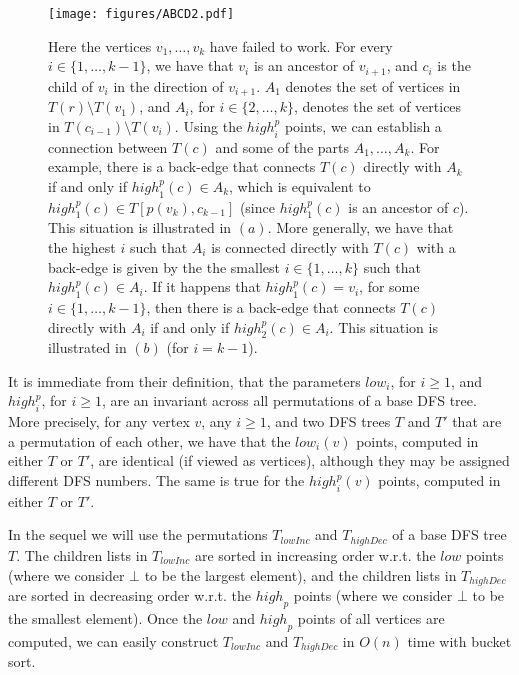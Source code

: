 \documentclass[11pt,a4paper]{article}
\begin{document}
\begin{figure}[h!]\centering
\texttt{[image: figures/ABCD2.pdf]}
\caption{\small{Here the vertices $v_1,\dots,v_k$ have failed to work. For every $i\in\{1,\dots,k-1\}$, we have that $v_i$ is an ancestor of $v_{i+1}$, and $c_i$ is the child of $v_i$ in the direction of $v_{i+1}$. $A_1$ denotes the set of vertices in $T(r)\setminus T(v_1)$, and $A_i$, for $i\in\{2,\dots,k\}$, denotes the set of vertices in $T(c_{i-1})\setminus T(v_i)$. Using the $\mathit{high}^p_i$ points, we can establish a connection between $T(c)$ and some of the parts $A_1,\dots,A_k$. For example, there is a back-edge that connects $T(c)$ directly with $A_k$ if and only if $\mathit{high}^p_1(c)\in A_k$, which is equivalent to $\mathit{high}^p_1(c)\in T[p(v_k),c_{k-1}]$ (since $\mathit{high}^p_1(c)$ is an ancestor of $c$). This situation is illustrated in $(a)$. More generally, we have that the highest $i$ such that $A_i$ is connected directly with $T(c)$ with a back-edge is given by the the smallest $i\in\{1,\dots,k\}$ such that $\mathit{high}^p_1(c)\in A_i$. If it happens that $\mathit{high}^p_1(c)=v_i$, for some $i\in\{1,\dots,k-1\}$, then there is a back-edge that connects $T(c)$ directly with $A_i$ if and only if $\mathit{high}^p_2(c)\in A_i$. This situation is illustrated in $(b)$ (for $i=k-1$).}}\label{figure:ABCD2}
\end{figure}

It is immediate from their definition, that the parameters $\mathit{low}_i$, for $i\geq 1$, and $\mathit{high}^p_i$, for $i\geq 1$, are an invariant across all permutations of a base DFS tree. More precisely, for any vertex $v$, any $i\geq 1$, and two DFS trees $T$ and $T'$ that are a permutation of each other, we have that the $\mathit{low}_i(v)$ points, computed in either $T$ or $T'$, are identical (if viewed as vertices), although they may be assigned different DFS numbers. The same is true for the $\mathit{high}^p_i(v)$ points, computed in either $T$ or $T'$.

In the sequel we will use the permutations $T_\mathit{lowInc}$ and $T_\mathit{highDec}$ of a base DFS tree $T$. The children lists in $T_\mathit{lowInc}$ are sorted in increasing order w.r.t. the $\mathit{low}$ points (where we consider $\bot$ to be the largest element), and the children lists in $T_\mathit{highDec}$ are sorted in decreasing order w.r.t. the $\mathit{high}_p$ points (where we consider $\bot$ to be the smallest element). Once the $\mathit{low}$ and $\mathit{high}_p$ points of all vertices are computed, we can easily construct $T_\mathit{lowInc}$ and $T_\mathit{highDec}$ in $O(n)$ time with bucket sort.
\end{document}
